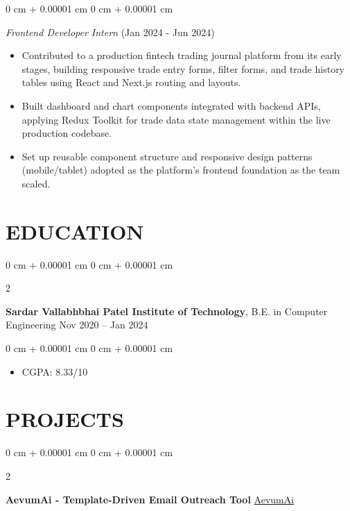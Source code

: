 \documentclass[10pt, letterpaper]{article}
\newenvironment{highlights}{
    \begin{itemize}[
        topsep=0.10 cm,
        parsep=0.10 cm,
        partopsep=0pt,
        itemsep=0pt,
        leftmargin=0 cm + 10pt
    ]
}{
    \end{itemize}
} %
\newenvironment{onecolentry}{
    \begin{adjustwidth}{
        0 cm + 0.00001 cm
    }{
        0 cm + 0.00001 cm
    }
}{
    \end{adjustwidth}
} %
\newenvironment{twocolentry}[2][]{
    \onecolentry
    \def\secondColumn{#2}
    \setcolumnwidth{\fill, 4.5 cm}
    \begin{paracol}{2}
}{
    \switchcolumn \raggedleft \secondColumn
    \end{paracol}
    \endonecolentry
} %
\begin{document}
\begin{onecolentry}
    \vspace{0.10 cm}

    \textit{Frontend Developer Intern} (Jan 2024 - Jun 2024)
    \begin{highlights}
        \item Contributed to a production fintech trading journal platform from its early stages, building responsive trade entry forms, filter forms, and trade history tables using React and Next.js routing and layouts.
        \item Built dashboard and chart components integrated with backend APIs, applying Redux Toolkit for trade data state management within the live production codebase.
        \item Set up reusable component structure and responsive design patterns (mobile/tablet) adopted as the platform's frontend foundation as the team scaled.
    \end{highlights}
\end{onecolentry}

\section{EDUCATION}
\begin{twocolentry}{
        Nov 2020 – Jan 2024
    }
    \textbf{Sardar Vallabhbhai Patel Institute of Technology}, B.E. in Computer Engineering\end{twocolentry}

\vspace{0.10 cm}
\begin{onecolentry}
    \begin{highlights}
        \item CGPA: 8.33/10
    \end{highlights}
\end{onecolentry}


\section{PROJECTS}
\begin{twocolentry}{
        \href{https://aevum-ai.vercel.app/}{AevumAi}
    }
    \textbf{AevumAi - Template-Driven Email Outreach Tool}\end{twocolentry}
\end{document}
